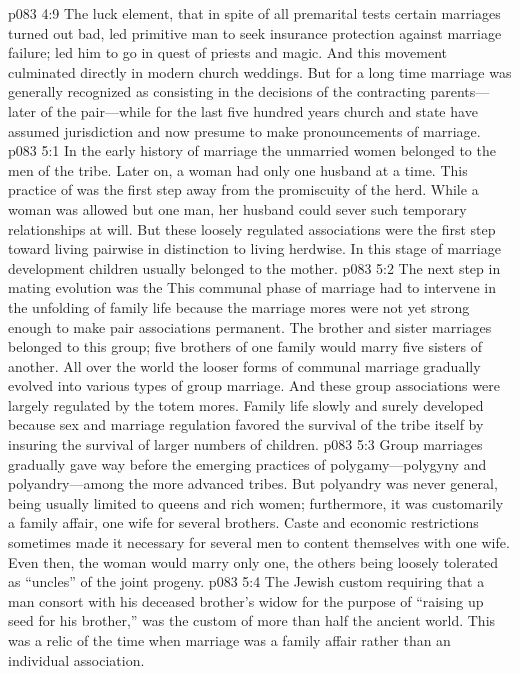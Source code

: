 \vs p083 4:9 The luck element, that in spite of all premarital tests certain marriages turned out bad, led primitive man to seek insurance protection against marriage failure; led him to go in quest of priests and magic. And this movement culminated directly in modern church weddings. But for a long time marriage was generally recognized as consisting in the decisions of the contracting parents---later of the pair---while for the last five hundred years church and state have assumed jurisdiction and now presume to make pronouncements of marriage.
\vs p083 5:1 In the early history of marriage the unmarried women belonged to the men of the tribe. Later on, a woman had only one husband at a time. This practice of  was the first step away from the promiscuity of the herd. While a woman was allowed but one man, her husband could sever such temporary relationships at will. But these loosely regulated associations were the first step toward living pairwise in distinction to living herdwise. In this stage of marriage development children usually belonged to the mother.
\vs p083 5:2 The next step in mating evolution was the  This communal phase of marriage had to intervene in the unfolding of family life because the marriage mores were not yet strong enough to make pair associations permanent. The brother and sister marriages belonged to this group; five brothers of one family would marry five sisters of another. All over the world the looser forms of communal marriage gradually evolved into various types of group marriage. And these group associations were largely regulated by the totem mores. Family life slowly and surely developed because sex and marriage regulation favored the survival of the tribe itself by insuring the survival of larger numbers of children.
\vs p083 5:3 Group marriages gradually gave way before the emerging practices of polygamy---polygyny and polyandry---among the more advanced tribes. But polyandry was never general, being usually limited to queens and rich women; furthermore, it was customarily a family affair, one wife for several brothers. Caste and economic restrictions sometimes made it necessary for several men to content themselves with one wife. Even then, the woman would marry only one, the others being loosely tolerated as “uncles” of the joint progeny.
\vs p083 5:4 The Jewish custom requiring that a man consort with his deceased brother’s widow for the purpose of “raising up seed for his brother,” was the custom of more than half the ancient world. This was a relic of the time when marriage was a family affair rather than an individual association.
